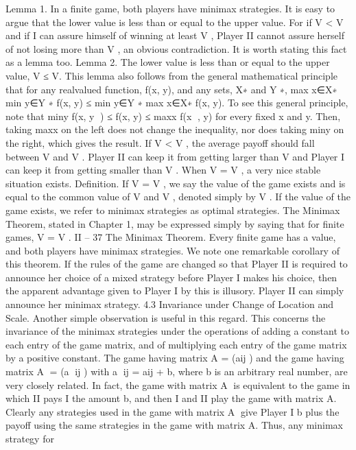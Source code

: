 Lemma 1. In a finite game, both players have minimax strategies.
It is easy to argue that the lower value is less than or equal to the upper value. For if
V < V and if I can assure himself of winning at least V , Player II cannot assure herself of
not losing more than V , an obvious contradiction. It is worth stating this fact as a lemma
too.
Lemma 2. The lower value is less than or equal to the upper value,
V ≤ V.
This lemma also follows from the general mathematical principle that for any realvalued
function, f(x, y), and any sets, X∗ and Y ∗,
max
x∈X∗ min
y∈Y ∗ f(x, y) ≤ min
y∈Y ∗ max
x∈X∗ f(x, y).
To see this general principle, note that miny f(x, y
) ≤ f(x, y) ≤ maxx f(x
, y) for every
fixed x and y. Then, taking maxx on the left does not change the inequality, nor does
taking miny on the right, which gives the result.
If V < V , the average payoff should fall between V and V . Player II can keep it from
getting larger than V and Player I can keep it from getting smaller than V . When V = V ,
a very nice stable situation exists.
Definition. If V = V , we say the value of the game exists and is equal to the common
value of V and V , denoted simply by V . If the value of the game exists, we refer to
minimax strategies as optimal strategies.
The Minimax Theorem, stated in Chapter 1, may be expressed simply by saying that
for finite games, V = V .
II – 37
The Minimax Theorem. Every finite game has a value, and both players have minimax
strategies.
We note one remarkable corollary of this theorem. If the rules of the game are changed
so that Player II is required to announce her choice of a mixed strategy before Player I
makes his choice, then the apparent advantage given to Player I by this is illusory. Player
II can simply announce her minimax strategy.
4.3 Invariance under Change of Location and Scale. Another simple observation
is useful in this regard. This concerns the invariance of the minimax strategies under
the operations of adding a constant to each entry of the game matrix, and of multiplying
each entry of the game matrix by a positive constant. The game having matrix A = (aij )
and the game having matrix A = (a
ij ) with a
ij = aij + b, where b is an arbitrary real
number, are very closely related. In fact, the game with matrix A is equivalent to the
game in which II pays I the amount b, and then I and II play the game with matrix A.
Clearly any strategies used in the game with matrix A give Player I b plus the payoff
using the same strategies in the game with matrix A. Thus, any minimax strategy for
